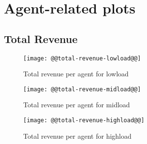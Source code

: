 \documentclass[11pt]{article}
\begin{document}
\newpage
\section{Agent-related plots}
\subsection{Total Revenue}\label{sub:total_revenue}
\begin{figure}[htbp]
  \begin{center}
    \texttt{[image: @@total-revenue-lowload@@]}
    \caption{Total revenue per agent for lowload}
    \label{fig:total-revenue-lowload}
  \end{center}
\end{figure}
\begin{figure}[htbp]
  \begin{center}
    \texttt{[image: @@total-revenue-midload@@]}
    \caption{Total revenue per agent for midload}
    \label{fig:total-revenue-midload}
  \end{center}
\end{figure}
\begin{figure}[htbp]
  \begin{center}
    \texttt{[image: @@total-revenue-highload@@]}
    \caption{Total revenue per agent for highload}
    \label{fig:total-revenue-highload}
  \end{center}
\end{figure}
\end{document}
